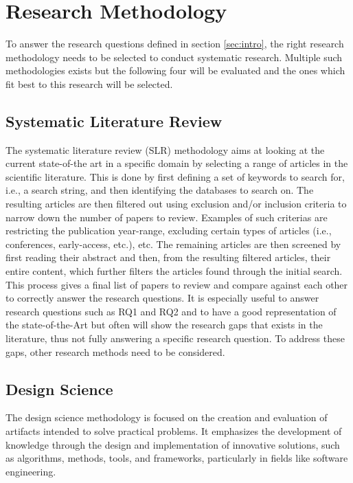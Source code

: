 
\section{Research Methodology}
\label{sec:methodology}

To answer the research questions defined in section \ref{sec:intro},
the right research methodology needs to be selected to conduct 
systematic research.
Multiple such methodologies exists but the following four will be evaluated
and the ones which fit best to this research will be selected.

\subsection{Systematic Literature Review}

The systematic literature review (SLR) methodology aims at
looking at the current state-of-the art in a specific domain by selecting a range 
of articles in the scientific literature\cite{KITCHENHAM2009SLR}.
This is done by first defining a set of keywords to search for, i.e., a search string, 
and then identifying the databases to search on.
The resulting articles are then filtered out using exclusion and/or inclusion criteria
to narrow down the number of papers to review.
Examples of such criterias are restricting the publication year-range,
excluding certain types of articles (i.e., conferences, early-access, etc.), etc.
The remaining articles are then screened by first reading 
their abstract and then, from the resulting filtered articles, their entire content,
which further filters the articles found through the initial search.
This process gives a final list of papers to review and compare against each other 
to correctly answer the research questions. 
It is especially useful to answer research questions such as RQ1 and RQ2
and to have a good representation of the state-of-the-Art
but often will show the research gaps that exists in the literature,
thus not fully answering a specific research question.
To address these gaps, other research methods need to be considered.

\subsection{Design Science}

The design science methodology is focused on the creation and evaluation 
of artifacts intended to solve practical problems. It emphasizes 
the development of knowledge through the design and implementation 
of innovative solutions, such as algorithms, methods, tools, 
and frameworks, particularly in fields like software engineering\cite{Wieringa2010DesignScienceMethod}.

